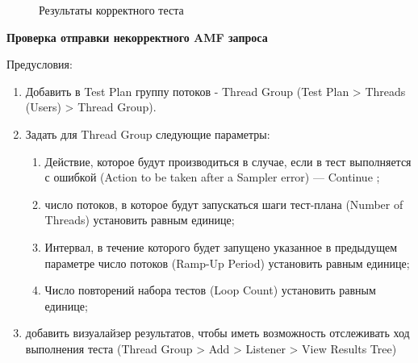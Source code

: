\begin{figure}[ht]
\caption{Результаты корректного теста}
\label{ris:positiveTest.png}
\end{figure}

{\bfseries Проверка отправки некорректного AMF запроса}

Предусловия:

\begin{enumerate}
\item Добавить в Test Plan группу потоков - Thread Group (Test Plan > Threads (Users) > Thread Group).
\item Задать для Thread Group следующие параметры:

\begin{enumerate}
\item Действие, которое будут производиться в случае, если в тест выполняется с ошибкой
(Action to be taken after a Sampler error) --- Continue ;
\item число потоков, в которое будут запускаться шаги тест-плана (Number of Threads) установить равным единице;
\item Интервал, в течение которого будет запущено указанное в предыдущем параметре
число потоков (Ramp-Up Period) установить равным единице;
\item Число повторений набора тестов (Loop Count) установить равным единице;
\end{enumerate}

\item добавить визуалайзер результатов, чтобы иметь возможность отслеживать ход выполнения теста (Thread Group >
Add > Listener > View Results Tree)
\end{enumerate}

